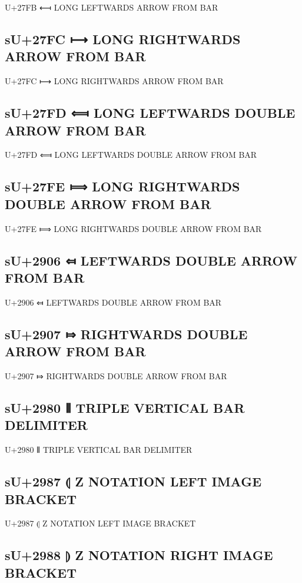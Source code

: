 U+27FB ⟻ LONG LEFTWARDS ARROW FROM BAR

\subsection{sU+27FC ⟼ LONG RIGHTWARDS ARROW FROM BAR}

U+27FC ⟼ LONG RIGHTWARDS ARROW FROM BAR

\subsection{sU+27FD ⟽ LONG LEFTWARDS DOUBLE ARROW FROM BAR}

U+27FD ⟽ LONG LEFTWARDS DOUBLE ARROW FROM BAR

\subsection{sU+27FE ⟾ LONG RIGHTWARDS DOUBLE ARROW FROM BAR}

U+27FE ⟾ LONG RIGHTWARDS DOUBLE ARROW FROM BAR

\subsection{sU+2906 ⤆ LEFTWARDS DOUBLE ARROW FROM BAR}

U+2906 ⤆ LEFTWARDS DOUBLE ARROW FROM BAR

\subsection{sU+2907 ⤇ RIGHTWARDS DOUBLE ARROW FROM BAR}

U+2907 ⤇ RIGHTWARDS DOUBLE ARROW FROM BAR

\subsection{sU+2980 ⦀ TRIPLE VERTICAL BAR DELIMITER}

U+2980 ⦀ TRIPLE VERTICAL BAR DELIMITER

\subsection{sU+2987 ⦇ Z NOTATION LEFT IMAGE BRACKET}

U+2987 ⦇ Z NOTATION LEFT IMAGE BRACKET

\subsection{sU+2988 ⦈ Z NOTATION RIGHT IMAGE BRACKET}

